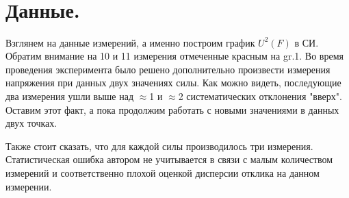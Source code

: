 \\
\\
\\
\\
\\
\\
\\
\\
\\
\\
\\
\\
\\
\\
\\
\\
\\
\\
\\
\\
\\
\\
\\
\\
\\
\\
\\
\\
\\
\\
\\
\\
\\
\\
\\
\\
\\
\\
\section{\label{sec:level1}Данные.}

Взглянем на данные измерений, а именно построим график $U^2 (F)$ в СИ. Обратим внимание на 10 и 11 измерения отмеченные красным на gr.1. Во время проведения эксперимента было решено дополнительно произвести измерения напряжения при данных двух значениях силы. Как можно видеть, последующие два измерения ушли выше над $\approx$1 и $\approx$2 систематических отклонения "вверх". Оставим этот факт, а пока продолжим работать с новыми значениями в данных двух точках. 

Также стоит сказать, что для каждой силы производилось три измерения. Статистическая ошибка автором не учитывается в связи с малым количеством измерений и соответственно плохой оценкой дисперсии отклика на данном измерении. \\

